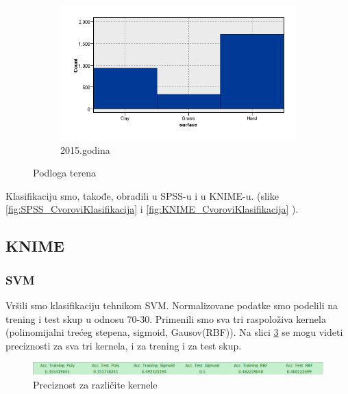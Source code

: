 \documentclass[a4paper]{article}
\begin{document}
\begin{figure}[H]
	\begin{subfigure}[h]{\textwidth}
		\begin{center}
			\includegraphics[scale=0.30]{Klasifikacija/HistogramiPodlogaTerena/Graphboard2015.png}
		\end{center}
		\caption{2015.godina}
		\label{fig:Podloga2015}
	\end{subfigure}
	
	\caption{Podloga terena}
	\label{fig:Podloga}
\end{figure} 

Klasifikaciju smo, takođe, obradili u SPSS-u i u KNIME-u. (slike \ref{fig:SPSS_CvoroviKlasifikacija} i \ref{fig:KNIME_CvoroviKlasifikacija} ).

\subsection{KNIME}

\subsubsection{SVM}

Vršili smo klasifikaciju tehnikom SVM. Normalizovane podatke smo podelili na trening i test skup u odnosu 70-30.
Primenili smo sva tri raspoloživa kernela (polinomijalni trećeg stepena, sigmoid, Gausov(RBF)).
Na slici \ref{fig:precision} se mogu videti preciznosti za sva tri kernela, i za trening i za test skup.

\begin{figure}[h!]
	\begin{center}
		\includegraphics[scale=0.45]{KNIME_project/SVM/preciznost}
	\end{center}
	\caption{Preciznost za različite kernele}
	\label{fig:precision}
\end{figure}
\end{document}
